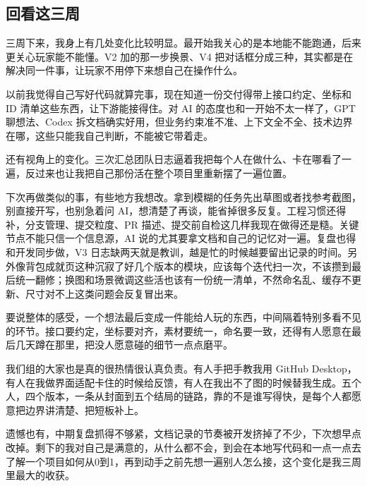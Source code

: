 \subsection{回看这三周}

三周下来，我身上有几处变化比较明显。最开始我关心的是本地能不能跑通，后来更关心玩家能不能懂。V2 加的那一步换景、V4 把对话框分成三种，其实都是在解决同一件事，让玩家不用停下来想自己在操作什么。

以前我觉得自己写好代码就算完事，现在知道一份交付得带上接口约定、坐标和 ID 清单这些东西，让下游能接得住。对 AI 的态度也和一开始不太一样了，GPT 聊想法、Codex 拆文档确实好用，但业务约束准不准、上下文全不全、技术边界在哪，这些只能我自己判断，不能被它带着走。

还有视角上的变化。三次汇总团队日志逼着我把每个人在做什么、卡在哪看了一遍，反过来也让我把自己那份活在整个项目里重新摆了一遍位置。

下次再做类似的事，有些地方我想改。拿到模糊的任务先出草图或者找参考截图，别直接开写，也别急着问 AI，想清楚了再谈，能省掉很多反复。工程习惯还得补，分支管理、提交粒度、PR 描述、提交前自检这几样我现在做得还是糙。关键节点不能只信一个信息源，AI 说的尤其要拿文档和自己的记忆对一遍。复盘也得和开发同步做，V3 日志缺两天就是教训，越是忙的时候越要留出记录的时间。另外像背包成就页这种沉寂了好几个版本的模块，应该每个迭代扫一次，不该攒到最后统一翻修；换图和场景微调这些活也该有一份统一清单，不然命名乱、缓存不更新、尺寸对不上这类问题会反复冒出来。

要说整体的感受，一个想法最后变成一件能给人玩的东西，中间隔着特别多看不见的环节。接口要约定，坐标要对齐，素材要统一，命名要一致，还得有人愿意在最后几天蹲在那里，把没人愿意碰的细节一点点磨平。

我们组的大家也是真的很热情很认真负责。有人手把手教我用 GitHub Desktop，有人在我做界面适配卡住的时候给反馈，有人在我出不了图的时候替我生成。五个人，四个版本，一条从封面到五个结局的链路，靠的不是谁写得快，是每个人都愿意把边界讲清楚、把短板补上。

遗憾也有，中期复盘抓得不够紧，文档记录的节奏被开发挤掉了不少，下次想早点改掉。剩下的我对自己是满意的，从什么都不会，到会在本地写代码和一点一点去了解一个项目如何从0到1，再到动手之前先想一遍别人怎么接，这个变化是我三周里最大的收获。
